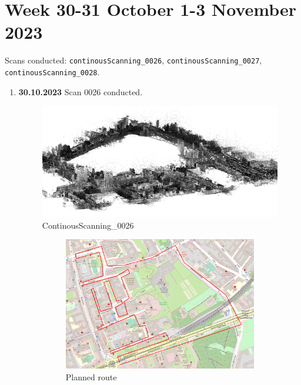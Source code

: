 \documentclass[a4paper,12pt]{book}
\begin{document}
\section{Week 30-31 October 1-3 November 2023}
Scans conducted: \verb|continousScanning_0026|, \verb|continousScanning_0027|, \verb|continousScanning_0028|.\\
\begin{enumerate}
	\item \textbf{30.10.2023} Scan 0026 conducted.
	\begin{figure}[H]
		\includegraphics[width=1\linewidth]{cloud26}
		\caption{ContinousScanning\_0026}
	\end{figure}
	\begin{figure}[H]
		\centering
		\begin{subfigure}{.95\textwidth}
			\centering
			\includegraphics[width=1\linewidth]{route_p26}
			\caption{Planned route}
			\label{fig:a26}
		\end{subfigure}%
		\linebreak
		\begin{subfigure}{.95\textwidth}

\end{subfigure}
\end{figure}
\end{enumerate}
\end{document}
